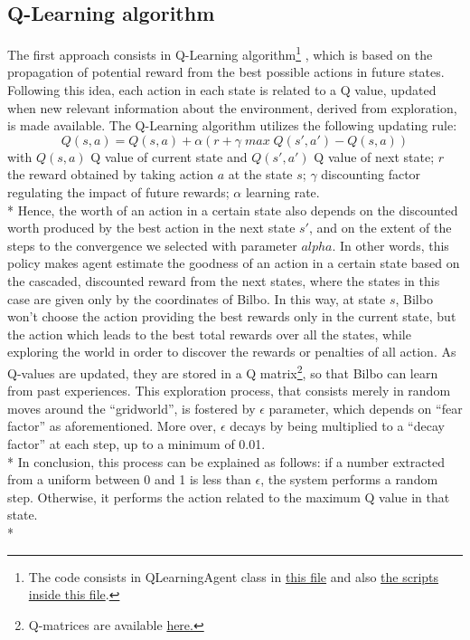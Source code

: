 \subsection{Q-Learning algorithm}
The first approach consists in Q-Learning algorithm\footnote{The code consists in QLearningAgent class in \href{https://github.com/moiraghif/DragonHunting/blob/master/Bilbo\%20World/agents.py}{this file} and also \href{https://github.com/moiraghif/DragonHunting/blob/master/Bilbo\%20World/Bilbo_q_learning.py}{the scripts inside this file}.} \cite{2}, which is based on the propagation of potential reward from the best possible actions in future states. Following this idea, each action in each state is related to a Q value, updated when new relevant information about the environment, derived from exploration, is made available. The Q-Learning algorithm utilizes the following updating rule:
$${\scriptstyle Q(s,a)=Q(s,a)+\alpha(r+\gamma\;max\;Q(s',a') - Q(s,a))}$$
with $Q(s,a)$ Q value of current state and $Q(s',a')$ Q value of next state; $r$ the reward obtained by taking action $a$ at the state $s$; $\gamma$ discounting factor regulating the impact of future rewards; $\alpha$ learning rate.\\*
Hence, the worth of an action in a certain state also depends on the discounted worth produced by the best action in the next state $s'$, and on the extent of the steps to the convergence we selected with parameter $alpha$. In other words, this policy makes agent estimate the goodness of an action in a certain state based on the cascaded, discounted reward from the next states, where the states in this case are given only by the coordinates of Bilbo. 
In this way, at state $s$, Bilbo won't choose the action providing the best rewards only in the current state, but the action which leads to the best total rewards over all the states, while exploring the world in order to discover the rewards or penalties of all action. As Q-values are updated, they are stored in a Q matrix\footnote{Q-matrices are available \href{https://github.com/moiraghif/DragonHunting/tree/master/Bilbo\%20World/models}{here.}}, so that Bilbo can learn from past experiences. This exploration process, that consists merely in random moves around the ``gridworld'', is fostered by $\epsilon$ parameter, which depends on ``fear factor'' as aforementioned. More over, $\epsilon$ decays by being multiplied to a ``decay factor'' at each step, up to a minimum of 0.01.\\*
In conclusion, this process can be explained as follows: if a number extracted from a uniform between 0 and 1 is less than $\epsilon$, the system performs a random step. Otherwise, it performs the action related to the maximum Q value in that state.\\*
